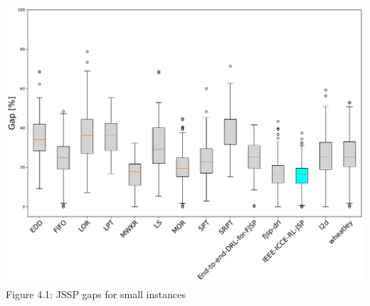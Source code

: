 \begin{center}
    \includegraphics[width=0.9\linewidth]{images/horizontal_boxplot_jssp_small.pdf}\\
    Figure 4.1: JSSP gaps for small instances
\end{center}

